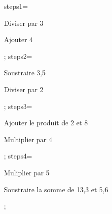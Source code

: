 \documentclass[exercice]{thedocument}%
\begin{document}
%
\bgroup\small
\>steps1={\item Diviser par 3\item Ajouter 4};%
\>steps2={\item Soustraire 3,5\item Diviser par 2};%
\>steps3={\item Ajouter le produit de 2 et 8\item Multiplier par 4};%
\>steps4={\item Muliplier par 5\item Soustraire la somme de 13,3 et 5,6};%
\egroup
\end{document}
